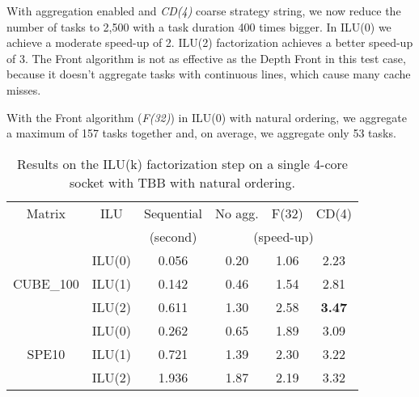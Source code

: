 With aggregation enabled and {\em CD(4)} coarse strategy string, we now reduce the number
of tasks to 2,500 with a task duration 400 times bigger.
In ILU(0) we achieve a moderate speed-up of 2. ILU(2) factorization achieves a
better speed-up of 3. The Front algorithm is not as effective as
the Depth Front in this test case, because it doesn't aggregate tasks
with continuous lines, which cause many cache misses.


With the Front algorithm ({\em F(32)}) in ILU(0) with natural ordering,
we aggregate a maximum of 157 tasks together and, on average, we aggregate only 53 tasks.

\begin{table}[!h]
  \renewcommand{\arraystretch}{1.3}
  \caption{Results on the ILU(k) factorization step on a single 4-core
    socket with TBB with natural ordering.}
  \label{tab:tbb:4:facto:no}
  \centering
  \begin{tabular}{|c|c||c|c|c|c|}
    \hline
    Matrix & ILU & Sequential & No agg. & F(32) & CD(4)\\
    &     &  (second)  & \multicolumn{3}{c|}{(speed-up)}\\
    \hline
    \hline
    \hline
    & ILU(0) & 0.056 & 0.20 & 1.06 & 2.23\\
    CUBE\_100 & ILU(1) & 0.142 & 0.46 & 1.54 & 2.81\\
    & ILU(2) & 0.611 & 1.30 & 2.58 & {\bf 3.47}\\
    \hline
    & ILU(0) & 0.262 & 0.65 & 1.89 & 3.09\\
    SPE10     & ILU(1) & 0.721 & 1.39 & 2.30 & 3.22\\
    & ILU(2) & 1.936 & 1.87 & 2.19 & 3.32\\
    \hline
  \end{tabular}
\end{table}


